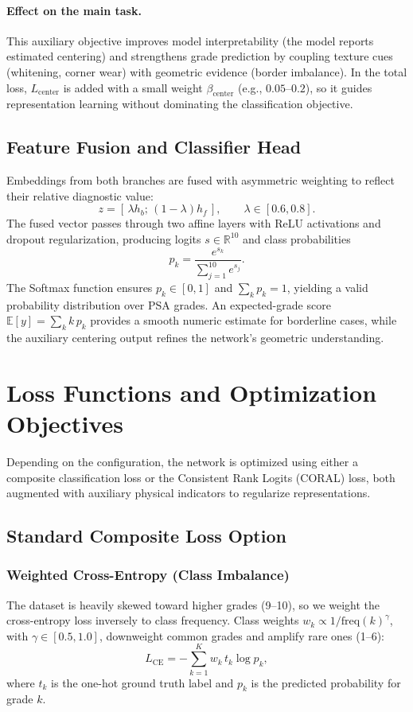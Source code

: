 \documentclass[12pt]{article}
\begin{document}
\paragraph{Effect on the main task.}
This auxiliary objective improves model interpretability (the model reports estimated centering) and strengthens grade prediction by coupling texture cues (whitening, corner wear) with geometric evidence (border imbalance). 
In the total loss, $L_{\text{center}}$ is added with a small weight $\beta_{\text{center}}$ (e.g., $0.05$--$0.2$), so it guides representation learning without dominating the classification objective.





\subsection{Feature Fusion and Classifier Head}
Embeddings from both branches are fused with asymmetric weighting to reflect their relative diagnostic value:
\[
z = [\,\lambda h_b;\,(1-\lambda)h_f\,], \qquad \lambda \in [0.6,0.8].
\]
The fused vector passes through two affine layers with ReLU activations and dropout regularization, producing logits $s \in \mathbb{R}^{10}$ and class probabilities
\[
p_k = \frac{e^{s_k}}{\sum_{j=1}^{10} e^{s_j}}.
\]
The Softmax function ensures $p_k \in [0,1]$ and $\sum_k p_k = 1$, yielding a valid probability distribution over PSA grades. 
An expected-grade score $\mathbb{E}[y] = \sum_k k\,p_k$ provides a smooth numeric estimate for borderline cases, while the auxiliary centering output refines the network’s geometric understanding.


\section{Loss Functions and Optimization Objectives}

Depending on the configuration, the network is optimized using either a composite classification loss or the Consistent Rank Logits (CORAL) loss, both augmented with auxiliary physical indicators to regularize representations.

\subsection{Standard Composite Loss Option}

\subsubsection{Weighted Cross-Entropy (Class Imbalance)}
The dataset is heavily skewed toward higher grades (9--10), so we weight the cross-entropy loss inversely to class frequency.
Class weights $w_k \propto 1/\text{freq}(k)^\gamma$, with $\gamma \in [0.5,1.0]$, downweight common grades and amplify rare ones (1--6):
\[
L_{\text{CE}} = -\sum_{k=1}^{K} w_k\, t_k \log p_k,
\]
where $t_k$ is the one-hot ground truth label and $p_k$ is the predicted probability for grade $k$.
\end{document}
